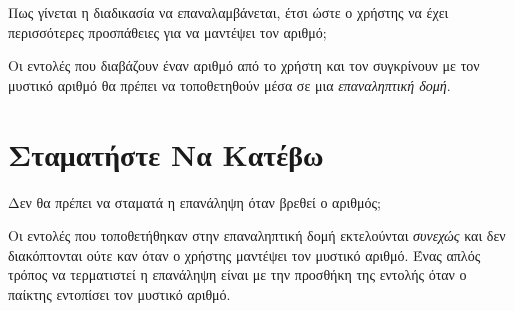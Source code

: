 \documentclass[a4paper,11pt,oneside]{book}
\begin{document}
\begin{question}
Πως γίνεται η διαδικασία να επαναλαμβάνεται, έτσι ώστε ο χρήστης να έχει περισσότερες προσπάθειες για να μαντέψει τον αριθμό;
\end{question}


Οι εντολές που διαβάζουν έναν αριθμό από το χρήστη και τον συγκρίνουν με τον μυστικό αριθμό θα πρέπει να τοποθετηθούν μέσα σε μια \emph{επαναληπτική δομή}.



\section{Σταματήστε Να Κατέβω}

\begin{question}
Δεν θα πρέπει να σταματά η επανάληψη όταν βρεθεί ο αριθμός;
\end{question}

Οι εντολές που τοποθετήθηκαν στην επαναληπτική δομή εκτελούνται \emph{συνεχώς} και δεν διακόπτονται ούτε καν όταν ο χρήστης μαντέψει τον μυστικό αριθμό. Ένας απλός τρόπος να τερματιστεί η επανάληψη είναι με την προσθήκη της εντολής  όταν ο παίκτης εντοπίσει τον μυστικό αριθμό.
\end{document}
